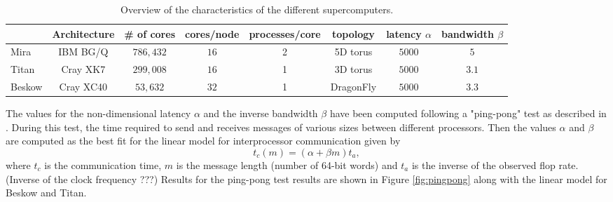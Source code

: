 \documentclass{sig-alternate}
\begin{document}
\begin{table}
\centering
\caption{Overview of the characteristics of the different supercomputers.}
\begin{tabular}{l|ccccccc} 
\hline
 & Architecture & \# of cores & cores/node &processes/core&topology& latency
 $\alpha$ &bandwidth  $\beta$\\
 \hline
Mira & IBM BG/Q & $786,432$ & $16$ &2& 5D torus & $5000$ & $5$\\ 
Titan & Cray XK7 & $299,008$ & $16$ &1&3D torus& $5000$ & $3.1$\\ 
Beskow & Cray XC40 & $53,632$ & $32$ &1&DragonFly & $5000$ & $3.3$\\
\hline
\end{tabular}
\label{tab:computer_charac}
\end{table}

The values for the non-dimensional latency $\alpha$ and the inverse bandwidth $\beta$ have been computed following a "ping-pong" test as described in \cite{fischer:scaling}. During this test, the time required to send and receives messages of various sizes between different processors. Then the values $\alpha$ and $\beta$ are computed as the best fit for the linear model for interprocessor communication given by
\begin{equation}
 t_c(m) = (\alpha + \beta m) t_a,
\end{equation}
where $t_c$ is the communication time, $m$ is the message length (number of 64-bit words) and $t_a$ is the inverse of the observed flop rate. (Inverse of the clock frequency ???) 
Results for the ping-pong test results are shown in Figure \ref{fig:pingpong} along with the linear model for Beskow and Titan.
\end{document}
